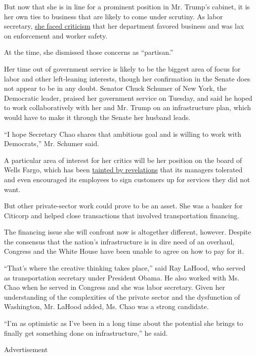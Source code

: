 But now that she is in line for a prominent position in Mr. Trump's
cabinet, it is her own ties to business that are likely to come under
scrutiny. As labor secretary,
\href{http://www.nytimes.com/2009/01/10/washington/10chao.html}{she
faced criticism} that her department favored business and was lax on
enforcement and worker safety.

At the time, she dismissed those concerns as ``partisan.''

Her time out of government service is likely to be the biggest area of
focus for labor and other left-leaning interests, though her
confirmation in the Senate does not appear to be in any doubt. Senator
Chuck Schumer of New York, the Democratic leader, praised her government
service on Tuesday, and said he hoped to work collaboratively with her
and Mr. Trump on an infrastructure plan, which would have to make it
through the Senate her husband leads.

``I hope Secretary Chao shares that ambitious goal and is willing to
work with Democrats,'' Mr. Schumer said.

A particular area of interest for her critics will be her position on
the board of Wells Fargo, which has been
\href{http://www.nytimes.com/2016/09/09/business/dealbook/wells-fargo-fined-for-years-of-harm-to-customers.html}{tainted
by revelations} that its managers tolerated and even encouraged its
employees to sign customers up for services they did not want.

But other private-sector work could prove to be an asset. She was a
banker for Citicorp and helped close transactions that involved
transportation financing.

The financing issue she will confront now is altogether different,
however. Despite the consensus that the nation's infrastructure is in
dire need of an overhaul, Congress and the White House have been unable
to agree on how to pay for it.

``That's where the creative thinking takes place,'' said Ray LaHood, who
served as transportation secretary under President Obama. He also worked
with Ms. Chao when he served in Congress and she was labor secretary.
Given her understanding of the complexities of the private sector and
the dysfunction of Washington, Mr. LaHood added, Ms. Chao was a strong
candidate.

``I'm as optimistic as I've been in a long time about the potential she
brings to finally get something done on infrastructure,'' he said.

Advertisement

